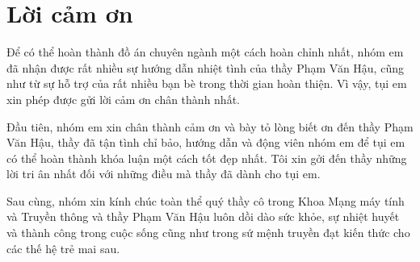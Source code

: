 \chapter*{Lời cảm ơn}

Để có thể hoàn thành đồ án chuyên ngành một cách hoàn chỉnh nhất,
nhóm em đã nhận được rất nhiều sự hướng dẫn nhiệt tình của thầy Phạm Văn Hậu,
cũng như từ sự hỗ trợ của rất nhiều bạn bè trong thời gian hoàn thiện.
Vì vậy,
tụi em xin phép được gửi lời cảm ơn chân thành nhất.

Đầu tiên,
nhóm em xin chân thành cảm ơn và bày tỏ lòng biết ơn đến thầy Phạm Văn Hậu,
thầy đã tận tình chỉ bảo,
hướng dẫn và động viên nhóm em để tụi em có thể hoàn thành khóa luận một cách tốt đẹp nhất.
Tôi xin gởi đến thầy những lời tri ân nhất đối với những điều mà thầy đã dành cho tụi em.

Sau cùng,
nhóm xin kính chúc toàn thể quý thầy cô trong Khoa Mạng máy tính và
Truyền thông và thầy Phạm Văn Hậu luôn dồi dào sức khỏe,
sự nhiệt huyết và thành công trong cuộc sống cũng như trong
sứ mệnh truyền đạt kiến thức cho các thế hệ trẻ mai sau.
